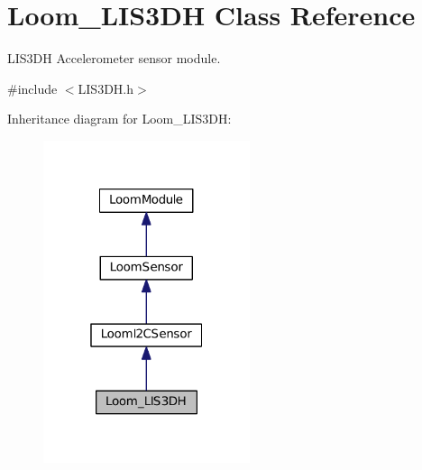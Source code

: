 \hypertarget{class_loom___l_i_s3_d_h}{}\section{Loom\+\_\+\+L\+I\+S3\+DH Class Reference}
\label{class_loom___l_i_s3_d_h}


L\+I\+S3\+DH Accelerometer sensor module.  




{\ttfamily \#include $<$L\+I\+S3\+D\+H.\+h$>$}



Inheritance diagram for Loom\+\_\+\+L\+I\+S3\+DH\+:\nopagebreak
\begin{figure}[H]
\begin{center}
\leavevmode
\includegraphics[width=172pt]{class_loom___l_i_s3_d_h__inherit__graph}
\end{center}
\end{figure}
